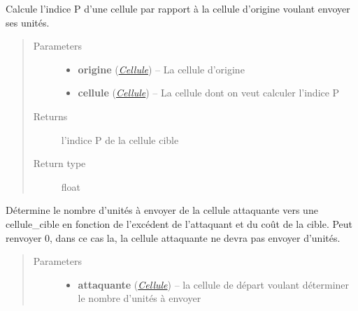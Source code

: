 \documentclass[letterpaper,10pt,english]{sphinxmanual}
\begin{document}
\begin{fulllineitems}
\begin{fulllineitems}
\label{index:StrategieAnalyse.StrategieAnalyse.indiceP}
Calcule l'indice P d'une cellule par rapport à la cellule d'origine voulant envoyer ses unités.
\begin{quote}\begin{description}
\item[{Parameters}] \leavevmode\begin{itemize}
\item {} 
\textbf{origine} ({\hyperref[index:module-Cellule]{\emph{Cellule}}}) -- La cellule d'origine

\item {} 
\textbf{cellule} ({\hyperref[index:module-Cellule]{\emph{Cellule}}}) -- La cellule dont on veut calculer l'indice P

\end{itemize}

\item[{Returns}] \leavevmode
l'indice P de la cellule cible

\item[{Return type}] \leavevmode
float

\end{description}\end{quote}

\end{fulllineitems}


\begin{fulllineitems}
\label{index:StrategieAnalyse.StrategieAnalyse.nbUnitesAEnvoyer}
Détermine le nombre d'unités à envoyer de la cellule attaquante vers une cellule\_cible en fonction de l'excédent de l'attaquant et du coût de la cible. 
Peut renvoyer 0, dans ce cas la, la cellule attaquante ne devra pas envoyer d'unités.
\begin{quote}\begin{description}
\item[{Parameters}] \leavevmode\begin{itemize}
\item {} 
\textbf{attaquante} ({\hyperref[index:module-Cellule]{\emph{Cellule}}}) -- la cellule de départ voulant déterminer le nombre d'unités à envoyer


\end{itemize}
\end{description}
\end{quote}
\end{fulllineitems}
\end{fulllineitems}
\end{document}
